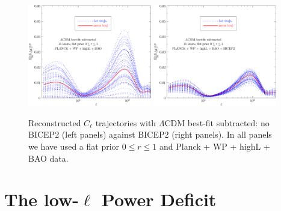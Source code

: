 \documentclass[a4paper,11pt]{article}
\def \halffigwidth{0.48\textwidth}
\begin{document}
\begin{figure}
\includegraphics[width = \halffigwidth]{nobicep_spline0_p11_dclBB_trajs.pdf}%
\includegraphics[width = \halffigwidth]{spline0_p11_dclBB_trajs.pdf}
\caption{Reconstructed $C_\ell$ trajectories with $\Lambda$CDM best-fit subtracted: no BICEP2 (left panels) against BICEP2 (right panels). In all panels we have used a flat prior $0\le r\le 1$ and Planck + WP + highL + BAO data.  \label{fig:traj_cls}}
\end{figure}


\section{The low-$\ell$ Power Deficit \label{sec:anomaly}}
\end{document}
